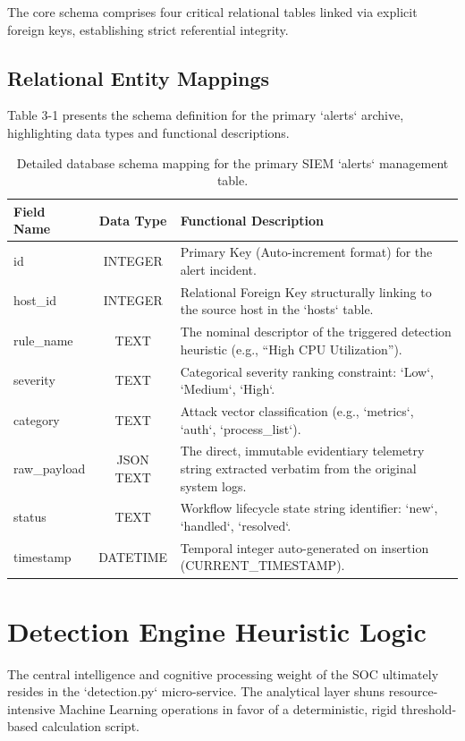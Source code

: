 The core schema comprises four critical relational tables linked via explicit foreign keys, establishing strict referential integrity.

\subsection{Relational Entity Mappings}
Table 3-1 presents the schema definition for the primary `alerts` archive, highlighting data types and functional descriptions.

\begin{table}[h]
\centering
\small
\begin{tabularx}{\textwidth}{|l|c|X|}
\hline
\textbf{Field Name} & \textbf{Data Type} & \textbf{Functional Description} \\ \hline
id & INTEGER & Primary Key (Auto-increment format) for the alert incident. \\ \hline
host\_id & INTEGER & Relational Foreign Key structurally linking to the source host in the `hosts` table. \\ \hline
rule\_name & TEXT & The nominal descriptor of the triggered detection heuristic (e.g., ``High CPU Utilization''). \\ \hline
severity & TEXT & Categorical severity ranking constraint: `Low`, `Medium`, `High`. \\ \hline
category & TEXT & Attack vector classification (e.g., `metrics`, `auth`, `process\_list`). \\ \hline
raw\_payload & JSON TEXT & The direct, immutable evidentiary telemetry string extracted verbatim from the original system logs. \\ \hline
status & TEXT & Workflow lifecycle state string identifier: `new`, `handled`, `resolved`. \\ \hline
timestamp & DATETIME & Temporal integer auto-generated on insertion (CURRENT\_TIMESTAMP). \\ \hline
\end{tabularx}
\caption{Detailed database schema mapping for the primary SIEM `alerts` management table.}
\end{table}

\section{Detection Engine Heuristic Logic}
The central intelligence and cognitive processing weight of the SOC ultimately resides in the `detection.py` micro-service. The analytical layer shuns resource-intensive Machine Learning operations in favor of a deterministic, rigid threshold-based calculation script. 

